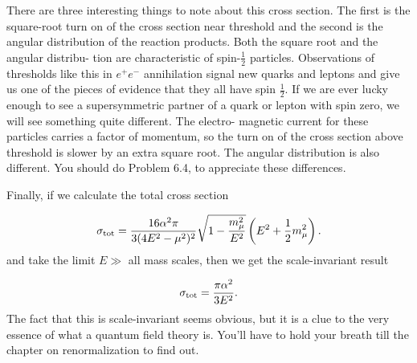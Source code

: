 There are three interesting things to note about this cross section. The first is the
square-root turn on of the cross section near threshold and the second is the angular
distribution of the reaction products. Both the square root and the angular distribu-
tion are characteristic of spin-$\frac12$ particles. Observations of thresholds like this in $e^+e^-$
annihilation signal new quarks and leptons and give us one of the pieces of evidence
that they all have spin $\frac12$. If we are ever lucky enough to see a supersymmetric partner
of a quark or lepton with spin zero, we will see something quite different. The electro-
magnetic current for these particles carries a factor of momentum, so the turn on of the
cross section above threshold is slower by an extra square root. The angular distribution
is also different. You should do Problem 6.4, to appreciate these differences.

Finally, if we calculate the total cross section

\begin{equation}
  \sigma_{\rm tot}=\frac{16\alpha^2\pi}{3(4E^2-\mu^2)^2}
  \sqrt{1-\frac{m_\mu^2}{E^2}}\left(E^2+\frac12m_\mu^2\right).
  \label{eq:6.11}
\end{equation}
and take the limit $E\gg$ all mass scales, then we get the scale-invariant result

\begin{equation}
  \sigma_{\rm tot}=\frac{\pi\alpha^2}{3E^2}.
  \label{eq:6.12}
\end{equation}
The fact that this is scale-invariant seems obvious, but it is a clue to the very essence
of what a quantum field theory is. You’ll have to hold your breath till the chapter on
renormalization to find out.

